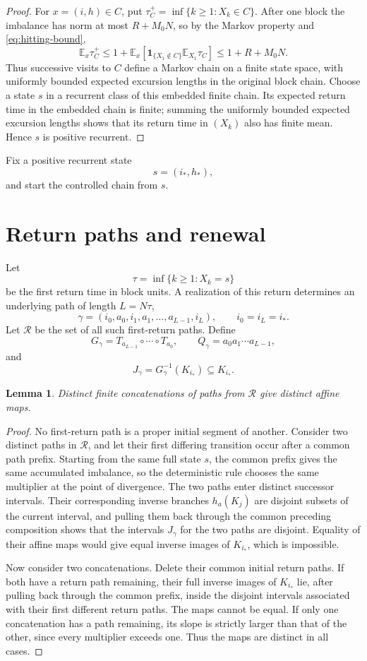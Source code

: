 \documentclass[11pt,a4paper]{amsart}
\newtheorem{lemma}[theorem]{Lemma}
\newcommand{\Ee}{\mathbb E}
\begin{document}
\begin{proof}
For $x=(i,h)\in C$, put $\tau_C^+=\inf\{k\ge1:X_k\in C\}$. After one block the imbalance has norm at most $R+M_0N$, so by the Markov property and \eqref{eq:hitting-bound},
\[
 \Ee_x\tau_C^+
 \le1+\Ee_x\!\left[\mathbf{1}_{\{X_1\notin C\}}
     \Ee_{X_1}\tau_C\right]
 \le1+R+M_0N.
\]
Thus successive visits to $C$ define a Markov chain on a finite state space, with uniformly bounded expected excursion lengths in the original block chain. Choose a state $s$ in a recurrent class of this embedded finite chain. Its expected return time in the embedded chain is finite; summing the uniformly bounded expected excursion lengths shows that its return time in $(X_k)$ also has finite mean. Hence $s$ is positive recurrent.
\end{proof}

Fix a positive recurrent state
\[
 s=(i_*,h_*),
\]
and start the controlled chain from $s$.

\section{Return paths and renewal}

Let
\[
 \tau=\inf\{k\ge1:X_k=s\}
\]
be the first return time in block units. A realization of this return determines an underlying path of length $L=N\tau$,
\[
 \gamma=(i_0,a_0,i_1,a_1,\ldots,a_{L-1},i_L),
 \qquad i_0=i_L=i_*.
\]
Let $\mathcal R$ be the set of all such first-return paths. Define
\[
 G_\gamma=T_{a_{L-1}}\circ\cdots\circ T_{a_0},
 \qquad Q_\gamma=a_0a_1\cdots a_{L-1},
\]
and
\[
 J_\gamma=G_\gamma^{-1}(K_{i_*})\subseteq K_{i_*}.
\]

\begin{lemma}\label{lem:injectivity}
Distinct finite concatenations of paths from $\mathcal R$ give distinct affine maps.
\end{lemma}

\begin{proof}
No first-return path is a proper initial segment of another. Consider two distinct paths in $\mathcal R$, and let their first differing transition occur after a common path prefix. Starting from the same full state $s$, the common prefix gives the same accumulated imbalance, so the deterministic rule chooses the same multiplier at the point of divergence. The two paths enter distinct successor intervals. Their corresponding inverse branches $h_a(K_j)$ are disjoint subsets of the current interval, and pulling them back through the common preceding composition shows that the intervals $J_\gamma$ for the two paths are disjoint. Equality of their affine maps would give equal inverse images of $K_{i_*}$, which is impossible.

Now consider two concatenations. Delete their common initial return paths. If both have a return path remaining, their full inverse images of $K_{i_*}$ lie, after pulling back through the common prefix, inside the disjoint intervals associated with their first different return paths. The maps cannot be equal. If only one concatenation has a path remaining, its slope is strictly larger than that of the other, since every multiplier exceeds one. Thus the maps are distinct in all cases.
\end{proof}
\end{document}
